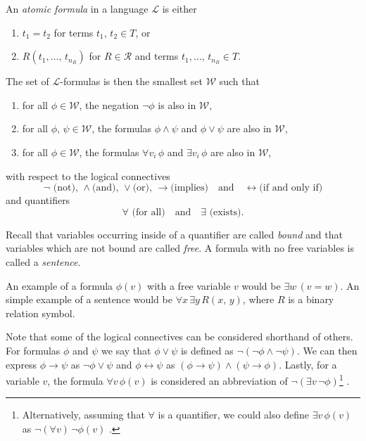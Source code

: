 \documentclass[../../main.tex]{subfiles}
\begin{document}
\begin{definition}\cite[Definition 1.1.5]{Mar02}\label{formula-def}
    An \textit{atomic formula} in a language $\mathcal{L}$ is either
    \begin{enumerate}
        \item $t_1 = t_2$ for terms $t_1,\, t_2 \in T$, or   
        \item $R(t_1,\ldots,\, t_{n_R})$ for $R \in \mathcal{R}$ and terms $t_1,\ldots,\, t_{n_R} \in T$.
    \end{enumerate}
    The set of $\mathcal{L}$-formulas is then the smallest set $\mathcal{W}$ such that
    \begin{enumerate}[label=(\roman*)]
        \item for all $\phi \in \mathcal{W}$, the negation $\lnot \phi$ is also in $\mathcal{W}$,
        \item for all $\phi,\, \psi \in \mathcal{W}$, the formulas $\phi \wedge \psi$ and $\phi \vee \psi$ are also in $\mathcal{W}$,
        \item for all $\phi \in \mathcal{W}$, the formulas $\forall v_i \, \phi$ and $\exists v_i \, \phi$ are also in $\mathcal{W}$,
    \end{enumerate}
    with respect to the logical connectives 
    $$\lnot \text{ (not), } \wedge \text{(and), } \vee \text{(or), } \rightarrow \text{(implies)}\quad \text{and}\quad \leftrightarrow \text{(if and only if)}$$
    and quantifiers $$\forall \text{ (for all)}\quad \text{and}\quad \exists \text{ (exists)}.$$
    
    Recall that variables occurring inside of a quantifier are called \textit{bound} and that variables which are not bound are called \textit{free}.
    A formula with no free variables is called a \textit{sentence}.
\end{definition}
An example of a formula $\phi(v)$ with a free variable $v$ would be $\exists w \, (v = w)$.
An simple example of a sentence would be $\forall x \, \exists y \, R(x,\, y)$, where $R$ is a binary relation symbol.

Note that some of the logical connectives can be considered shorthand of others.
For formulas $\phi$ and $\psi$ we say that $\phi \vee \psi$ is defined as $\lnot \left(\lnot \phi \wedge \lnot \psi\right)$.
We can then express $\phi \rightarrow \psi$ as $\lnot \phi \vee \psi$ and $\phi \leftrightarrow \psi$ as $\left(\phi \rightarrow \psi\right) \wedge \left(\psi \rightarrow \phi\right)$.
Lastly, for a variable $v$, the formula $\forall v\,  \phi(v)$ is considered an abbreviation of $\lnot \left(\exists v\, \lnot \phi\right)$\footnote{
    Alternatively, assuming that $\forall$ is a quantifier, we could also define $\exists v\, \phi(v)$ as $\lnot \left(\forall v\right)\, \lnot \phi(v)$ \cite[p.23]{Cha90}.
} \cite[Remark 1.1.7]{Mar02}.
\end{document}
